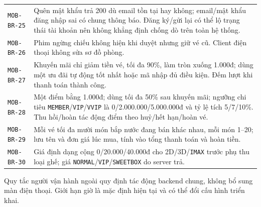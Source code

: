 \begin{longtable}{@{}P{0.23000\SRSWidth}P{0.77000\SRSWidth}@{}}
\texttt{MOB-\allowbreak{}BR-\allowbreak{}25} & Quên mật khẩu trả 200 dù email tồn tại hay không; email/\allowbreak{}mật khẩu đăng nhập sai có chung thông báo. Đăng ký/\allowbreak{}gửi lại có thể lộ trạng thái tài khoản nên không khẳng định chống dò trên toàn hệ thống. \\[3pt]
\texttt{MOB-\allowbreak{}BR-\allowbreak{}26} & Phim ngừng chiếu không hiện khi duyệt nhưng giữ vé cũ. Client điện thoại không sửa sơ đồ phòng. \\[3pt]
\texttt{MOB-\allowbreak{}BR-\allowbreak{}27} & Khuyến mãi chỉ giảm tiền vé, tối đa 90\%, làm tròn xuống 1.000đ; dùng một ưu đãi tự động tốt nhất hoặc mã nhập đủ điều kiện. Đếm lượt khi thanh toán thành công. \\[3pt]
\texttt{MOB-\allowbreak{}BR-\allowbreak{}28} & Một điểm bằng 1.000đ; dùng tối đa 50\% sau khuyến mãi; ngưỡng chi tiêu \texttt{MEMBER}/\allowbreak{}\texttt{VIP}/\allowbreak{}\texttt{VVIP} là 0/\allowbreak{}2.000.000/\allowbreak{}5.000.000đ và tỷ lệ tích 5/\allowbreak{}7/\allowbreak{}10\%. Thu hồi/\allowbreak{}hoàn tác động điểm theo huỷ/\allowbreak{}hết hạn/\allowbreak{}hoàn vé. \\[3pt]
\texttt{MOB-\allowbreak{}BR-\allowbreak{}29} & Mỗi vé tối đa mười món bắp nước đang bán khác nhau, mỗi món 1–20; lưu tên và đơn giá lúc mua, tính vào tổng thanh toán và hoàn tiền. \\[3pt]
\texttt{MOB-\allowbreak{}BR-\allowbreak{}30} & Giá định dạng cộng 0/\allowbreak{}20.000/\allowbreak{}40.000đ cho 2D/\allowbreak{}3D/\allowbreak{}\texttt{IMAX} trước phụ thu loại ghế; giá \texttt{NORMAL}/\allowbreak{}\texttt{VIP}/\allowbreak{}\texttt{SWEETBOX\allowbreak{}} do server trả. \\[3pt]
\end{longtable}
\endgroup

Quy tắc người vận hành ngoài quy định tác động backend chung, không bổ sung màn điện thoại. Giới hạn giờ là mặc định hiện tại và có thể đổi cấu hình triển khai.
